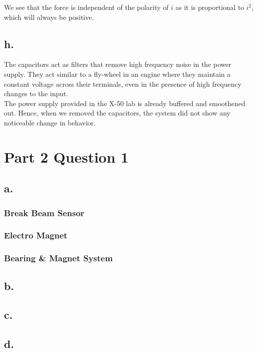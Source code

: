 \documentclass{article}
\theoremstyle{plain}
\theoremstyle{definition}
\theoremstyle{remark}
\begin{document}
We see that the force is independent of the polarity of $i$ as it is proportional to $i^2$, which will always be positive.


\subsection*{h.}
The capacitors act as filters that remove high frequency noise in the power supply. They act similar to a fly-wheel in an engine where they maintain a constant voltage across their terminals, even in the presence of high frequency changes to the input.\\

The power supply provided in the X-50 lab is already buffered and smoothened out. Hence, when we removed the capacitors, the system did not show any noticeable change in behavior.

\section{Part 2 Question 1}

\subsection*{a.}

\subsubsection{Break Beam Sensor}

\subsubsection{Electro Magnet}

\subsubsection{Bearing \& Magnet System}

\subsection*{b.}

\subsection*{c.}

\subsection*{d.}
\end{document}
